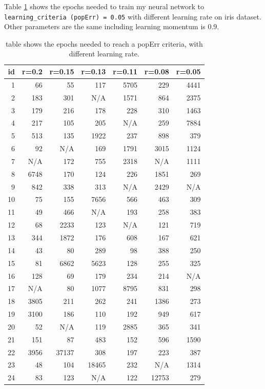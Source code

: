 \documentclass[11pt]{article}
\begin{document}
Table \ref{table-epochs-needed} shows the epochs needed to train my neural network to \texttt{learning\_criteria (popErr) = 0.05} with different learning rate on iris dataset. Other parameters are the same including learning momentum is 0.9.

\begin{table}[htb]
\caption{table shows the epochs needed to reach a popErr criteria, with different learning rate.  \label{table-epochs-needed}}
\centering
\begin{tabular}{rrrrrrr}
id & r=0.2 & r=0.15 & r=0.13 & r=0.11 & r=0.08 & r=0.05\\
\hline
1 & 66 & 55 & 117 & 5705 & 229 & 4441\\
2 & 183 & 301 & N/A & 1571 & 864 & 2375\\
3 & 179 & 216 & 178 & 228 & 310 & 1463\\
4 & 217 & 105 & 205 & N/A & 259 & 7884\\
5 & 513 & 135 & 1922 & 237 & 898 & 379\\
6 & 92 & N/A & 169 & 1791 & 3015 & 1124\\
7 & N/A & 172 & 755 & 2318 & N/A & 1111\\
8 & 6748 & 170 & 124 & 226 & 1851 & 269\\
9 & 842 & 338 & 313 & N/A & 2429 & N/A\\
10 & 75 & 155 & 7656 & 566 & 463 & 309\\
11 & 49 & 466 & N/A & 193 & 258 & 383\\
12 & 68 & 2233 & 123 & N/A & 121 & 719\\
13 & 344 & 1872 & 176 & 608 & 167 & 621\\
14 & 43 & 80 & 289 & 98 & 388 & 250\\
15 & 81 & 6862 & 5623 & 128 & 255 & 325\\
16 & 128 & 69 & 179 & 234 & 214 & N/A\\
17 & N/A & 80 & 1077 & 8795 & 831 & 298\\
18 & 3805 & 211 & 262 & 241 & 1386 & 273\\
19 & 3100 & 186 & 110 & 192 & 949 & 617\\
20 & 52 & N/A & 119 & 2885 & 365 & 341\\
21 & 151 & 87 & 483 & 152 & 596 & 1590\\
22 & 3956 & 37137 & 308 & 197 & 223 & 387\\
23 & 48 & 104 & 18465 & 232 & N/A & 1314\\
24 & 83 & 123 & N/A & 122 & 12753 & 279\\

\end{tabular}
\end{table}
\end{document}
